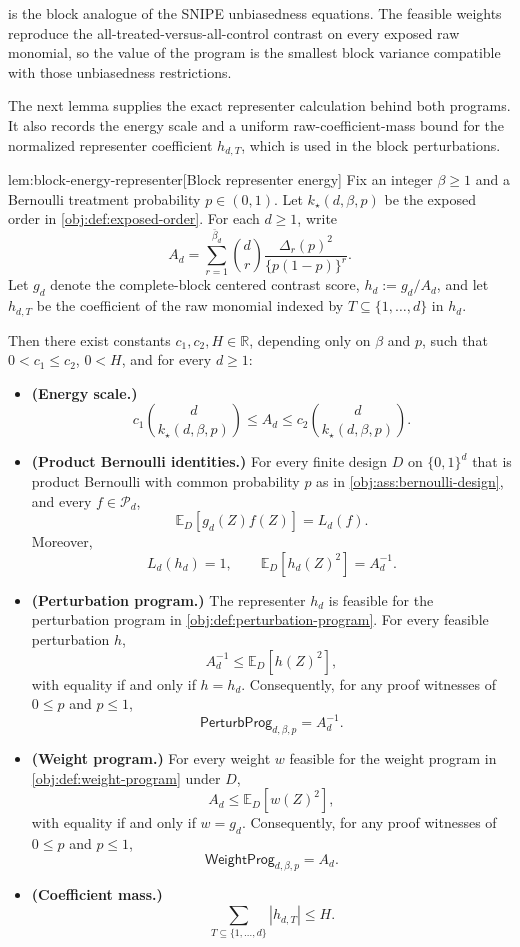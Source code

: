 \documentclass[11pt]{article}
\begin{document}
 is the block analogue of the SNIPE unbiasedness equations. The feasible weights reproduce the all-treated-versus-all-control contrast on every exposed raw monomial, so the value of the program is the smallest block variance compatible with those unbiasedness restrictions.

The next lemma supplies the exact representer calculation behind both programs. It also records the energy scale and a uniform raw-coefficient-mass bound for the normalized representer coefficient \(h_{d,T}\), which is used in the block perturbations.

\begin{lemmav}{lem:block-energy-representer}[Block representer energy]
Fix an integer \(\beta\ge 1\) and a Bernoulli treatment probability \(p\in(0,1)\). Let \(k_\star(d,\beta,p)\) be the exposed order in \cref{obj:def:exposed-order}. For each \(d\ge 1\), write
\[
A_d
=
\sum_{r=1}^{\bar\beta_d}
\binom d r
\frac{\Delta_r(p)^2}{\{p(1-p)\}^r}.
\]
Let \(g_d\) denote the complete-block centered contrast score, \(h_d:=g_d/A_d\), and let \(h_{d,T}\) be the coefficient of the raw monomial indexed by \(T\subseteq\{1,\ldots,d\}\) in \(h_d\).

Then there exist constants \(c_1,c_2,H\in\mathbb R\), depending only on \(\beta\) and \(p\), such that \(0<c_1\le c_2\), \(0<H\), and for every \(d\ge 1\):
\begin{itemize}
\item \textbf{(Energy scale.)}
\[
c_1\binom d {k_\star(d,\beta,p)}
\le
A_d
\le
c_2\binom d {k_\star(d,\beta,p)}.
\]
\item \textbf{(Product Bernoulli identities.)} For every finite design \(D\) on \(\{0,1\}^d\) that is product Bernoulli with common probability \(p\) as in \cref{obj:ass:bernoulli-design}, and every \(f\in\mathcal P_d\),
\[
\mathbb E_D[g_d(Z)f(Z)]
=
L_d(f).
\]
Moreover,
\[
L_d(h_d)=1,
\qquad
\mathbb E_D[h_d(Z)^2]=A_d^{-1}.
\]
\item \textbf{(Perturbation program.)} The representer \(h_d\) is feasible for the perturbation program in \cref{obj:def:perturbation-program}. For every feasible perturbation \(h\),
\[
A_d^{-1}\le \mathbb E_D[h(Z)^2],
\]
with equality if and only if \(h=h_d\). Consequently, for any proof witnesses of \(0\le p\) and \(p\le 1\),
\[
\mathsf{PerturbProg}_{d,\beta,p}=A_d^{-1}.
\]
\item \textbf{(Weight program.)} For every weight \(w\) feasible for the weight program in \cref{obj:def:weight-program} under \(D\),
\[
A_d\le \mathbb E_D[w(Z)^2],
\]
with equality if and only if \(w=g_d\). Consequently, for any proof witnesses of \(0\le p\) and \(p\le 1\),
\[
\mathsf{WeightProg}_{d,\beta,p}=A_d.
\]
\item \textbf{(Coefficient mass.)}
\[
\sum_{T\subseteq\{1,\ldots,d\}} |h_{d,T}|
\le
H.
\]
\end{itemize}
\end{lemmav}
\end{document}
